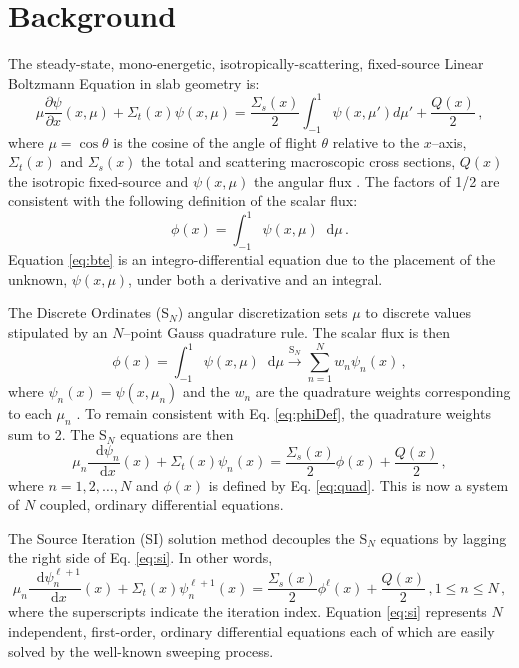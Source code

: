 \documentclass{anstrans}
\newcommand{\SN}{S$_N$\xspace}
\newcommand{\ud}{\mathop{}\!\mathrm{d}} %
\newcommand{\pderiv}[2]{\frac{\partial #1}{\partial #2}}
\newcommand{\dderiv}[2]{\frac{\ud #1}{\ud #2}}
\begin{document}
\section{Background}
	The steady-state, mono-energetic, isotropically-scattering, fixed-source Linear Boltzmann Equation in slab geometry is: 
		\begin{equation} \label{eq:bte}
			\mu \pderiv{\psi}{x}(x, \mu) + \Sigma_t(x) \psi(x,\mu) = 
			\frac{\Sigma_s(x)}{2} \int_{-1}^{1} \psi(x, \mu') d\mu' + \frac{Q(x)}{2} \,,
		\end{equation}
	where $\mu = \cos\theta$ is the cosine of the angle of flight $\theta$ relative to the $x$--axis, $\Sigma_t(x)$ and $\Sigma_s(x)$ the total and scattering macroscopic cross sections, $Q(x)$ the isotropic fixed-source and $\psi(x, \mu)$ the angular flux \cite{adams}. The factors of 1/2 are consistent with the following definition of the scalar flux:
		\begin{equation} \label{eq:phiDef}
			\phi(x) = \int_{-1}^1 \psi(x, \mu) \ud \mu \,.
		\end{equation}
	Equation \ref{eq:bte} is an integro-differential equation due to the placement of the unknown, $\psi(x,\mu)$, under both a derivative and an integral.

	The Discrete Ordinates (\SN) angular discretization sets $\mu$ to discrete values stipulated by an $N$--point Gauss quadrature rule. The scalar flux is then 
		\begin{equation} \label{eq:quad}
			\phi(x) = \int_{-1}^1 \psi(x, \mu) \ud\mu 
				\xrightarrow{\text{S}_N} \sum_{n=1}^N w_n \psi_n(x) \,,
		\end{equation}
	where $\psi_n(x) = \psi(x,\mu_n)$ and the $w_n$ are the quadrature weights corresponding to each $\mu_n$ \cite{llnl}. To remain consistent with Eq. \ref{eq:phiDef}, the quadrature weights sum to 2. The \SN equations are then 
		\begin{equation} \label{eq:sn}
			\mu_n \dderiv{\psi_n}{x}(x) + \Sigma_t(x) \psi_n(x) = 
			\frac{\Sigma_s(x)}{2} \phi(x) + \frac{Q(x)}{2} \,, 
		\end{equation}
	where $n = 1, 2, \dots, N$ and $\phi(x)$ is defined by Eq. \ref{eq:quad}. This is now a system of $N$ coupled, ordinary differential equations. 

	The Source Iteration (SI) solution method decouples the \SN equations by lagging the right side of Eq. \ref{eq:si}. In other words, 
		\begin{equation} \label{eq:si}
			\mu_n \dderiv{\psi_n^{\ell+1}}{x}(x) + \Sigma_t(x) \psi_n^{\ell+1}(x) = 
			\frac{\Sigma_s(x)}{2} \phi^{\ell}(x) + \frac{Q(x)}{2} \,, 1 \leq n \leq N \,,
		\end{equation}
	where the superscripts indicate the iteration index. 
	Equation \ref{eq:si} represents $N$ independent, first-order, ordinary differential equations each of which are easily solved by the well-known sweeping process. 
\end{document}
